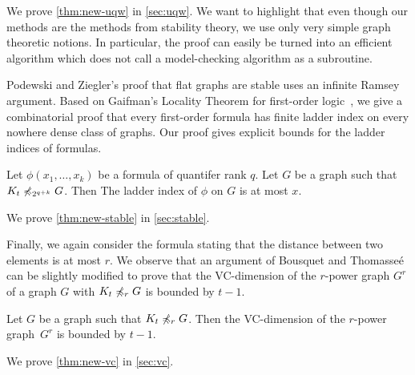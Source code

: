 We prove \cref{thm:new-uqw} in \cref{sec:uqw}. We want to highlight
that even though our methods are the methods from stability theory, 
we use only very simple graph theoretic notions. In particular, the
proof can easily be turned into an efficient algorithm which does not
call a model-checking algorithm as a subroutine. 

\bigskip
Podewski and Ziegler's proof that flat graphs are stable uses an 
infinite Ramsey argument. Based on Gaifman's Locality Theorem for
first-order logic~\cite{gaifman1982local}, we give a combinatorial 
proof that every first-order formula has finite ladder index on every
nowhere dense class of graphs. Our proof gives explicit bounds for the
ladder indices of formulas. 

\begin{theorem}\label{thm:new-stable}
Let $\phi(x_1,\ldots, x_k)$ be a formula of quantifer rank $q$. 
Let $G$ be a graph such that $K_t\not\preccurlyeq_{2^{q+k}} G$. Then 
The ladder index of $\phi$ on $G$ is at most $x$. 
\end{theorem}

We prove \cref{thm:new-stable} in \cref{sec:stable}. 

\bigskip

Finally, we again consider the formula stating that the distance
between two elements is at most $r$. 
We observe that an argument of Bousquet and 
Thomasse\'e~\cite{BousquetT15} can be slightly modified to prove that 
the VC-dimension of the $r$-power graph $G^r$ of a graph $G$
with $K_t\not\preccurlyeq_r G$ is bounded by $t-1$.

\begin{theorem}\label{thm:new-vc}
Let $G$ be a graph such that $K_t\not\preccurlyeq_r G$. Then the
VC-dimension of the $r$-power graph~$G^r$ is bounded by $t-1$. 
\end{theorem}

We prove \cref{thm:new-vc} in \cref{sec:vc}. 
